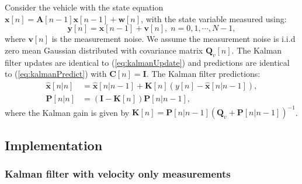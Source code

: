 \documentclass[11pt]{article}
\newcommand{\by}{\mathbf{y}}
\newcommand{\bv}{\mathbf{v}}
\newcommand{\bx}{\mathbf{x}}
\newcommand{\bw}{\mathbf{w}}
\newcommand{\bI}{\mathbf{I}}
\newcommand{\bA}{\mathbf{A}}
\newcommand{\bK}{\mathbf{K}}
\newcommand{\bQ}{\mathbf{Q}}
\newcommand{\bP}{\mathbf{P}}
\newcommand{\bC}{\mathbf{C}}
\begin{document}
Consider the vehicle with the state equation $\bx[n] = \bA[n-1]\bx[n-1] + \bw[n]$, with the state variable measured using:
\begin{equation}
	\by[n] =  \bx[n-1] + \bv[n], \; n=0,1,\cdots,N-1,
\label{eq:stateMeasurements}
\end{equation}
where $\bv[n]$ is the measurement noise. We assume the measurement noise is i.i.d zero mean Gaussian distributed with covariance matrix $\bQ_{v}[n]$. The Kalman filter updates are identical to (\ref{eq:kalmanUpdate}) and predictions are identical to (\ref{eq:kalmanPredict}) with $\bC[n] = \bI$. The Kalman filter predictions:
\begin{equation}
\begin{split}
	\hat{\bx}[n|n] &= \hat{\bx}[n|n-1] + \bK[n] \left( y[n] - \hat{\bx}[n|n-1] \right), \\
	\bP[n|n] &= \left(\bI - \bK[n]\right)\bP[n|n-1],
\end{split}
\label{eq:kalmanPosPredict}
\end{equation}
where the Kalman gain is given by $\bK[n] = \bP[n|n-1]\left(\bQ_{v}+\bP[n|n-1]\right)^{-1}$.


\subsection{Implementation}
\label{subsec:partB_implementation}


\subsubsection{Kalman filter with velocity only measurements}
\label{subsubsec:kalmanVelocity}
\end{document}
